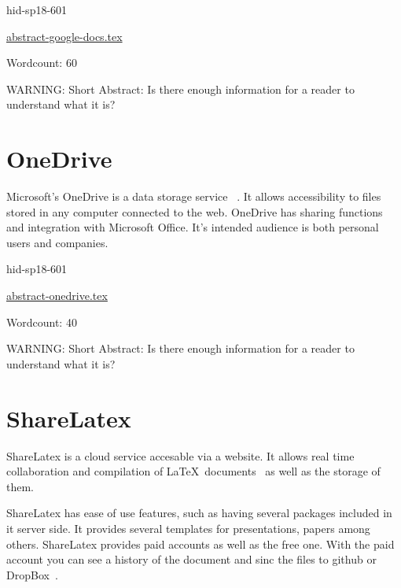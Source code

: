 \begin{IU}

hid-sp18-601

\href{https://github.com/cloudmesh-community/hid-sp18-601/blob/master//technology/abstract-google-docs.tex}{abstract-google-docs.tex}

 

Wordcount: 60

WARNING: Short Abstract: Is there enough information for a reader to understand what it is?

\end{IU}

\section{OneDrive}

Microsoft's OneDrive is a data storage service 
~\cite{hid-sp18-601-www-odrive-website}. It allows accessibility  to files
 stored in any computer connected to the web. OneDrive has sharing functions and
 integration with Microsoft Office. It's intended audience is both personal 
users and companies.

\begin{IU}

hid-sp18-601

\href{https://github.com/cloudmesh-community/hid-sp18-601/blob/master//technology/abstract-onedrive.tex}{abstract-onedrive.tex}

 

Wordcount: 40

WARNING: Short Abstract: Is there enough information for a reader to understand what it is?

\end{IU}

\section{ShareLatex}

ShareLatex is a cloud service accesable via a website. It allows real time 
collaboration and compilation of 
\LaTeX~documents~\cite{hid-sp18-601-www-slatex-documentation} as well as the 
storage of them. 
 
ShareLatex has ease of use features, such as having several packages included 
in it server side. It provides several templates for presentations, papers among
 others. ShareLatex provides paid accounts as well as the free one. With the 
 paid account you can see a history of the document and sinc the files to github
 or DropBox~\cite{hid-sp18-601-www-slatex-plans}.



